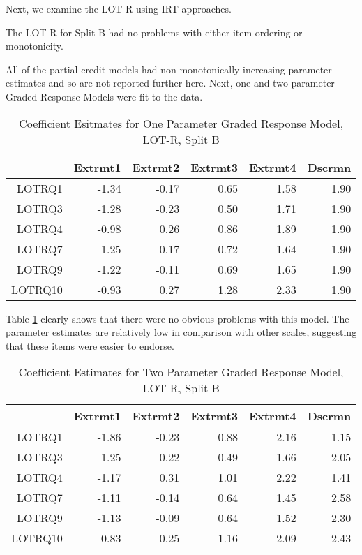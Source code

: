 \documentclass{article}
\begin{document}
Next, we examine the LOT-R using IRT approaches. 


The LOT-R for Split B had no problems with either item ordering or monotonicity. 






All of the partial credit models had non-monotonically increasing parameter estimates and so are not reported further here. 
Next, one and two parameter Graded Response Models were fit to the data. 



\begin{table}[ht]
\centering
\begin{tabular}{rrrrrr}
  \hline
 & Extrmt1 & Extrmt2 & Extrmt3 & Extrmt4 & Dscrmn \\ 
  \hline
LOTRQ1 & -1.34 & -0.17 & 0.65 & 1.58 & 1.90 \\ 
  LOTRQ3 & -1.28 & -0.23 & 0.50 & 1.71 & 1.90 \\ 
  LOTRQ4 & -0.98 & 0.26 & 0.86 & 1.89 & 1.90 \\ 
  LOTRQ7 & -1.25 & -0.17 & 0.72 & 1.64 & 1.90 \\ 
  LOTRQ9 & -1.22 & -0.11 & 0.69 & 1.65 & 1.90 \\ 
  LOTRQ10 & -0.93 & 0.27 & 1.28 & 2.33 & 1.90 \\ 
   \hline
\end{tabular}
\caption{Coefficient Esitmates for One Parameter Graded Response Model, LOT-R, Split B} 
\label{tab:lotr2bgrm1pl}
\end{table}
Table \ref{tab:lotr2bgrm1pl} clearly shows that there were no obvious problems with this model. The parameter estimates are relatively low in comparison with other scales, suggesting that these items were easier to endorse. 

\begin{table}[ht]
\centering
\begin{tabular}{rrrrrr}
  \hline
 & Extrmt1 & Extrmt2 & Extrmt3 & Extrmt4 & Dscrmn \\ 
  \hline
LOTRQ1 & -1.86 & -0.23 & 0.88 & 2.16 & 1.15 \\ 
  LOTRQ3 & -1.25 & -0.22 & 0.49 & 1.66 & 2.05 \\ 
  LOTRQ4 & -1.17 & 0.31 & 1.01 & 2.22 & 1.41 \\ 
  LOTRQ7 & -1.11 & -0.14 & 0.64 & 1.45 & 2.58 \\ 
  LOTRQ9 & -1.13 & -0.09 & 0.64 & 1.52 & 2.30 \\ 
  LOTRQ10 & -0.83 & 0.25 & 1.16 & 2.09 & 2.43 \\ 
   \hline
\end{tabular}
\caption{Coefficient Estimates for Two Parameter Graded Response Model, LOT-R, Split B} 
\label{tab:lotr2bgrm2pl}
\end{table}
\end{document}
